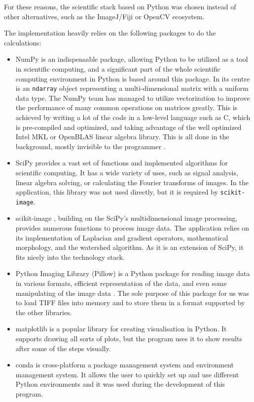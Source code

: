 \documentclass[
  digital,     %
  oneside,     %
  nosansbold,  %
  nocolorbold, %
  lof,         %
  lot,         %
]{fithesis4}
\begin{document}
For these reasons, the scientific stack based on Python was chosen instead of
other alternatives, such as the ImageJ/Fiji or OpenCV ecosystem.

The implementation heavily relies on the following packages to do the calculations:
\begin{itemize}
    \item{NumPy \cite{harris2020array} is an indispensable package, allowing
        Python to be utilized as a tool in scientific computing, and a
        significant part of the whole scientific computing environment in Python
        is based around this package. In its centre is an \texttt{ndarray} object
        representing a multi-dimensional matrix with a uniform data type. The
        NumPy team has managed to utilize vectorization to improve the
        performance of many common operations on matrices greatly. This is achieved by
        writing a lot of the code in a low-level language such as C, which is
        pre-compiled and optimized, and taking advantage of the well optimized
        Intel MKL or OpenBLAS linear algebra library. This is all done in the
        background, mostly invisible to the programmer \cite{numpyManual2022}.}
    \item{SciPy \cite{2020SciPy-NMeth} provides a vast set of functions and
        implemented algorithms for scientific computing. It has a wide variety of
        uses, such as signal analysis, linear algebra solving, or calculating the
        Fourier transforms of images. In the application, this library was not used
        directly, but it is required by \texttt{scikit-image}.}
    \item{scikit-image \cite{scikit-image}, building on the SciPy's
        multidimensional image processing, provides numerous functions to
        process image data. The application relies on its implementation of
        Laplacian and gradient operators, mathematical morphology, and the watershed
        algorithm. As it is an extension of SciPy, it fits nicely into the
        technology stack.}
    \item{Python Imaging Library (Pillow) is a Python package for reading image
        data in various formats, efficient representation of the data, and even
        some manipulating of the image data \cite{clarkc20102023}. The sole
        purpose of this package for us was to load TIFF files into memory
        and to store them in a format supported by the other libraries.}
    \item{matplotlib \cite{hunter2007} is a popular library for creating
        visualisation in Python. It supports drawing all sorts of plots, but the
        program uses it to show results after some of the steps visually.}
    \item{conda is cross-platform a package management system and environment
        management system. It allows the user to quickly set up and use different
        Python environments and it was used during the development of this program.
        \cite{conda-manual}}
\end{itemize}
\end{document}
